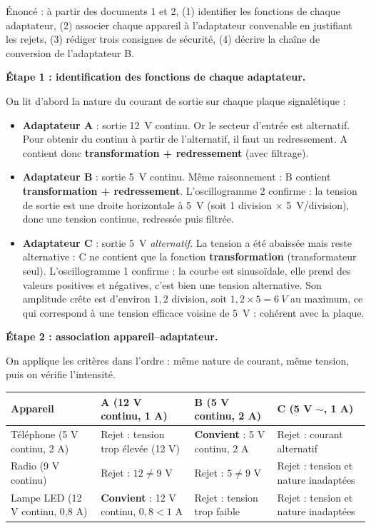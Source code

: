\documentclass[11pt]{article}
\begin{document}
\begin{exoresolu}
Énoncé : à partir des documents 1 et 2, (1) identifier les fonctions de chaque adaptateur, (2) associer chaque appareil à l'adaptateur convenable en justifiant les rejets, (3) rédiger trois consignes de sécurité, (4) décrire la chaîne de conversion de l'adaptateur B.

\tcblower

\textbf{Étape 1 : identification des fonctions de chaque adaptateur.}

On lit d'abord la nature du courant de sortie sur chaque plaque signalétique :

\begin{itemize}
\item \textbf{Adaptateur A} : sortie \SI{12}{V} continu. Or le secteur d'entrée est alternatif. Pour obtenir du continu à partir de l'alternatif, il faut un redressement. A contient donc \textbf{transformation + redressement} (avec filtrage).
\item \textbf{Adaptateur B} : sortie \SI{5}{V} continu. Même raisonnement : B contient \textbf{transformation + redressement}. L'oscillogramme 2 confirme : la tension de sortie est une droite horizontale à \SI{5}{V} (soit 1 division $\times$ \SI{5}{V}/division), donc une tension continue, redressée puis filtrée.
\item \textbf{Adaptateur C} : sortie \SI{5}{V} \emph{alternatif}. La tension a été abaissée mais reste alternative : C ne contient que la fonction \textbf{transformation} (transformateur seul). L'oscillogramme 1 confirme : la courbe est sinusoïdale, elle prend des valeurs positives et négatives, c'est bien une tension alternative. Son amplitude crête est d'environ $1{,}2$ division, soit $1{,}2 \times 5 = \SI{6}{V}$ au maximum, ce qui correspond à une tension efficace voisine de \SI{5}{V} : cohérent avec la plaque.
\end{itemize}

\textbf{Étape 2 : association appareil--adaptateur.}

On applique les critères dans l'ordre : même nature de courant, même tension, puis on vérifie l'intensité.

\begin{center}
\begin{tabularx}{\linewidth}{|l|X|X|X|}
\hline
\rowcolor{popblueL} \textbf{Appareil} & \textbf{A (12 V continu, 1 A)} & \textbf{B (5 V continu, 2 A)} & \textbf{C (5 V $\sim$, 1 A)} \\
\hline
Téléphone (5 V continu, 2 A) & Rejet : tension trop élevée (12 V) & \textbf{Convient} : 5 V continu, 2 A & Rejet : courant alternatif \\
\hline
Radio (9 V continu) & Rejet : $12 \neq 9$ V & Rejet : $5 \neq 9$ V & Rejet : tension et nature inadaptées \\
\hline
Lampe LED (12 V continu, 0,8 A) & \textbf{Convient} : 12 V continu, $0{,}8 < 1$ A & Rejet : tension trop faible & Rejet : tension et nature inadaptées \\
\hline
\end{tabularx}
\end{center}


\end{exoresolu}
\end{document}
